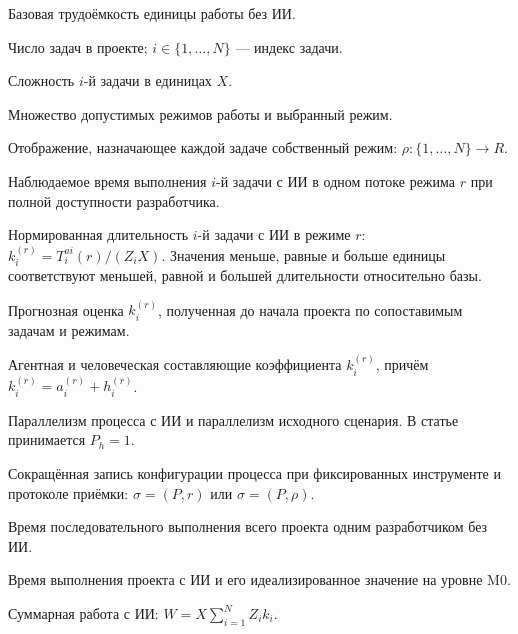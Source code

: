 \begin{description}[style=nextline]
  \item[$X$] Базовая трудоёмкость единицы работы без ИИ.

  \item[$N$] Число задач в проекте; $i\in\{1,\dots,N\}$ --- индекс задачи.

  \item[$Z_i$] Сложность $i$-й задачи в единицах $X$.

  \item[$R$, $r$] Множество допустимых режимов работы и выбранный режим.

  \item[$\rho$] Отображение, назначающее каждой задаче собственный режим:
  $\rho\colon\{1,\dots,N\}\to R$.

  \item[$T_i^{ai}(r)$] Наблюдаемое время выполнения $i$-й задачи с ИИ в одном
  потоке режима $r$ при полной доступности разработчика.

  \item[$k_i^{(r)}$] Нормированная длительность $i$-й задачи с ИИ в режиме $r$:
  $k_i^{(r)}=T_i^{ai}(r)/(Z_iX)$. Значения меньше, равные и больше единицы
  соответствуют меньшей, равной и большей длительности относительно базы.

  \item[$\hat{k}_i^{(r)}$] Прогнозная оценка $k_i^{(r)}$, полученная до начала
  проекта по сопоставимым задачам и режимам.

  \item[$a_i^{(r)}$, $h_i^{(r)}$] Агентная и человеческая составляющие
  коэффициента $k_i^{(r)}$, причём $k_i^{(r)}=a_i^{(r)}+h_i^{(r)}$.

  \item[$P$, $P_h$] Параллелизм процесса с ИИ и параллелизм исходного
  сценария. В статье принимается $P_h=1$.

  \item[$\sigma$] Сокращённая запись конфигурации процесса при фиксированных
  инструменте и протоколе приёмки: $\sigma=(P,r)$ или $\sigma=(P,\rho)$.

  \item[$T_h$] Время последовательного выполнения всего проекта одним
  разработчиком без ИИ.

  \item[$T_{ai}$, $T_{ai}^{(0)}$] Время выполнения проекта с ИИ и его
  идеализированное значение на уровне M0.

  \item[$W$] Суммарная работа с ИИ:
  $W=X\sum_{i=1}^{N}Z_i k_i$.


\end{description}

